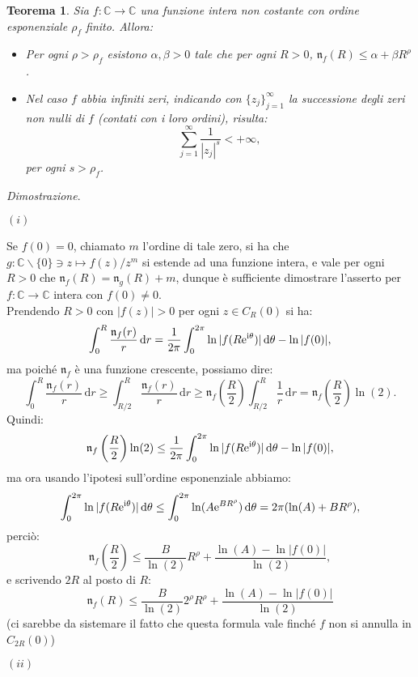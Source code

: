 \documentclass[11pt]{book}
\makeatletter
\theoremstyle{Definizione}
\theoremstyle{TeoremaProposizioneLemmaCorollarioCongettura}
\newtheorem{myteo}{Teorema}[section]
\theoremstyle{OsservazioneNotaEsempio}
\renewenvironment{proof}[1][\proofname]{\par
  \normalfont \topsep6\p@\@plus6\p@\relax
  \trivlist
  \item[\hskip\labelsep
        \itshape
    #1\@addpunct{.}]\ignorespaces
}{%
  \endtrivlist\@endpefalse
}
\renewenvironment{proof}{\textsl{Dimostrazione}.}{}
\newcommand{\C}{\mathbb{C}}
\newcommand{\tolto}{\smallsetminus}
\renewcommand{\i}{\textup{i}}
\newcommand{\e}{\textup{e}}
\renewcommand{\d}{\mathrm{d}}
\newcommand{\dtheta}{\, \d \theta}
\newcommand{\nzeri}[1][]{\mathfrak{n}_{#1}}
\makeatother
\begin{document}
\begin{boxteo}{}
\begin{myteo}
Sia $f:\C\longrightarrow \C$ una funzione intera non costante con ordine esponenziale $\rho_f$ finito. Allora:
\begin{itemize}
\item[$(i)$] Per ogni $\rho > \rho_f$ esistono $\alpha,\beta>0$ tale che per ogni $R >0$, $\nzeri[f](R) \leq \alpha + \beta R^\rho$.
\item[$(ii)$] Nel caso $f$ abbia infiniti zeri, indicando con $\{z_j\}_{j = 1}^\infty$ la successione degli zeri non nulli di $f$ (contati con i loro ordini), risulta:
$$
\sum_{j = 1}^\infty \frac{1}{|z_j|^s} < +\infty,
$$
per ogni $s > \rho_f$.
\end{itemize}
\end{myteo}
\tcblower
\begin{proof}
\hfill
\begin{flushleft}
$(i)$
\end{flushleft}
Se $f(0) = 0$, chiamato $m$ l'ordine di tale zero, si ha che $g:\C\tolto \{0\}\ni z \longmapsto f(z)/z^m$ si estende ad una funzione intera, e vale per ogni $R > 0$ che $\nzeri[f](R) = \nzeri[g](R)+m$, dunque è sufficiente dimostrare l'asserto per $f:\C\longrightarrow \C$ intera con $f(0)\neq 0$.\\
Prendendo $R > 0$ con $|f(z)| > 0$ per ogni $z\in C_R(0)$ si ha:
$$
\int_{0}^{R} \frac{\nzeri[f](r)}{r}\,\d r = \frac{1}{2\pi}\int_0^{2\pi} \ln|f(R\e^{\i\theta})|\dtheta - \ln|f(0)|,
$$
ma poiché $\nzeri[f]$ è una funzione crescente, possiamo dire:
$$
\int_{0}^{R} \frac{\nzeri[f](r)}{r}\,\d r \geq \int_{R/2}^{R} \frac{\nzeri[f](r)}{r}\,\d r \geq \nzeri[f]\left(\frac{R}{2}\right)\int_{R/2}^{R} \frac{1}{r}\,\d r = \nzeri[f]\left(\frac{R}{2}\right)\ln(2).
$$
Quindi:
$$
\nzeri[f]\left(\frac{R}{2}\right)\ln(2) \leq \frac{1}{2\pi}\int_{0}^{2\pi} \ln|f(R\e^{\i\theta})| \dtheta - \ln|f(0)|,
$$
ma ora usando l'ipotesi sull'ordine esponenziale abbiamo:
$$
\int_{0}^{2\pi} \ln|f(R\e^{\i\theta})| \dtheta \leq \int_{0}^{2\pi} \ln(A\e^{BR^\rho})\dtheta = 2\pi(\ln(A) + BR^\rho),
$$
perciò:
$$
\nzeri[f]\left(\frac{R}{2}\right) \leq \frac{B}{\ln(2)} R^\rho + \frac{\ln(A)-\ln|f(0)|}{\ln(2)},
$$
e scrivendo $2R$ al posto di $R$:
$$
\nzeri[f](R) \leq \frac{B}{\ln(2)}2^{\rho} R^\rho + \frac{\ln(A)-\ln|f(0)|}{\ln(2)}
$$
(ci sarebbe da sistemare il fatto che questa formula vale finché $f$ non si annulla in $C_{2R}(0)$)
\begin{flushleft}
$(ii)$
\end{flushleft}

\end{proof}
\end{boxteo}
\end{document}
